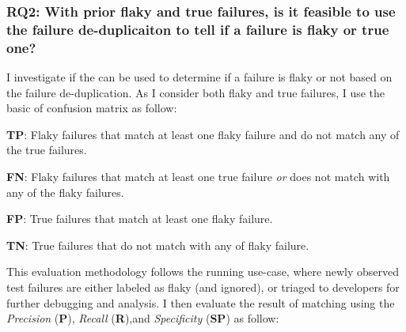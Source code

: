 
\subsubsection{RQ2: With prior flaky and true failures, is it feasible to use the failure de-duplicaiton to tell if a failure is flaky or true one?}
\label{matchingRQ2}



I investigate if the \syntax can be used to determine if a failure is flaky or not based on the failure de-duplication. As I consider both flaky and true failures, I use the basic of confusion matrix as follow:

\begin{description}
    \item \textbf{TP}: Flaky failures that match at least one flaky failure and do not match any of the true failures. 
    \item \textbf{FN}: Flaky failures that match at least one true failure \textit{or} does not match with any of the flaky failures. 
    \item \textbf{FP}: True failures that match at least one flaky failure. 
    \item \textbf{TN}: True failures that do not match with any of flaky failure.
    
\end{description}

This evaluation methodology follows the running use-case, where newly observed test failures are either labeled as flaky (and ignored), or triaged to developers for further debugging and analysis.
I then evaluate the result of matching using the \emph{Precision} (\textbf{P}), \emph{Recall} (\textbf{R}),and \emph{Specificity} (\textbf{SP}) as follow:

